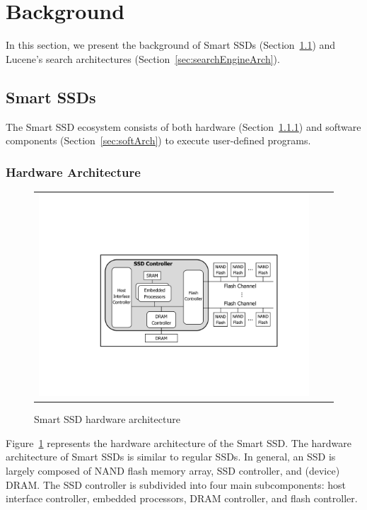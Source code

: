 

\section{Background}\label{sec:background}

In this section, we present the background of Smart SSDs (Section~\ref{sec:SSDInternals}) and Lucene's search architectures (Section~\ref{sec:searchEngineArch}).
\subsection{Smart SSDs}\label{sec:SSDInternals}
The Smart SSD ecosystem consists of both hardware (Section~\ref{sec:SSDhw}) and software components (Section~\ref{sec:softArch}) to execute user-defined programs.
\subsubsection{Hardware Architecture}\label{sec:SSDhw}

\begin{figure}[htbp]
  \centering
  \begin{tabular}{ccc}
 \includegraphics[width=0.95\columnwidth]{figures/SSDInternals.pdf}
\end{tabular}
  \caption{Smart SSD hardware architecture}
  \label{fig:SSDInternals}
 \end{figure}


Figure~\ref{fig:SSDInternals} represents the hardware architecture of the Smart SSD. The hardware architecture of Smart SSDs is similar to regular SSDs.
In general, an SSD is largely composed of NAND flash memory array, SSD controller, and (device) DRAM. The SSD controller is subdivided into four main subcomponents: host interface controller, embedded processors, DRAM controller, and flash controller.

